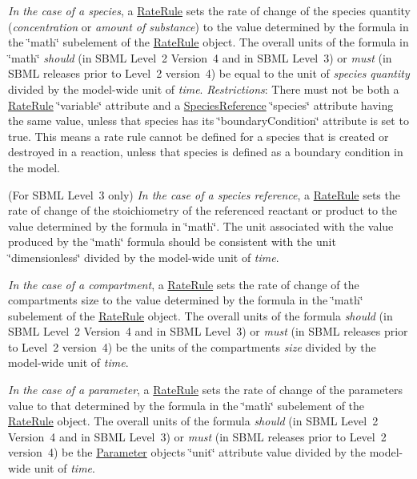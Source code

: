 \begin{DoxyItemize}
\item {\itshape In the case of a species}, a \hyperlink{class_rate_rule}{Rate\+Rule} sets the rate of change of the species\textquotesingle{} quantity ({\itshape concentration} or {\itshape amount of substance}) to the value determined by the formula in the \char`\"{}math\char`\"{} subelement of the \hyperlink{class_rate_rule}{Rate\+Rule} object. The overall units of the formula in \char`\"{}math\char`\"{} {\itshape should} (in S\+B\+ML Level~2 Version~4 and in S\+B\+ML Level~3) or {\itshape must} (in S\+B\+ML releases prior to Level~2 version~4) be equal to the unit of {\itshape species quantity} divided by the model-\/wide unit of {\itshape time}. {\itshape Restrictions}\+: There must not be both a \hyperlink{class_rate_rule}{Rate\+Rule} \char`\"{}variable\char`\"{} attribute and a \hyperlink{class_species_reference}{Species\+Reference} \char`\"{}species\char`\"{} attribute having the same value, unless that species has its \char`\"{}boundary\+Condition\char`\"{} attribute is set to {\ttfamily true}. This means a rate rule cannot be defined for a species that is created or destroyed in a reaction, unless that species is defined as a boundary condition in the model.


\item (For S\+B\+ML Level~3 only) {\itshape In the case of a species reference}, a \hyperlink{class_rate_rule}{Rate\+Rule} sets the rate of change of the stoichiometry of the referenced reactant or product to the value determined by the formula in \char`\"{}math\char`\"{}. The unit associated with the value produced by the \char`\"{}math\char`\"{} formula should be consistent with the unit \char`\"{}dimensionless\char`\"{} divided by the model-\/wide unit of {\itshape time}.


\item {\itshape In the case of a compartment}, a \hyperlink{class_rate_rule}{Rate\+Rule} sets the rate of change of the compartment\textquotesingle{}s size to the value determined by the formula in the \char`\"{}math\char`\"{} subelement of the \hyperlink{class_rate_rule}{Rate\+Rule} object. The overall units of the formula {\itshape should} (in S\+B\+ML Level~2 Version~4 and in S\+B\+ML Level~3) or {\itshape must} (in S\+B\+ML releases prior to Level~2 version~4) be the units of the compartment\textquotesingle{}s {\itshape size} divided by the model-\/wide unit of {\itshape time}.


\item {\itshape In the case of a parameter}, a \hyperlink{class_rate_rule}{Rate\+Rule} sets the rate of change of the parameter\textquotesingle{}s value to that determined by the formula in the \char`\"{}math\char`\"{} subelement of the \hyperlink{class_rate_rule}{Rate\+Rule} object. The overall units of the formula {\itshape should} (in S\+B\+ML Level~2 Version~4 and in S\+B\+ML Level~3) or {\itshape must} (in S\+B\+ML releases prior to Level~2 version~4) be the \hyperlink{class_parameter}{Parameter} object\textquotesingle{}s \char`\"{}unit\char`\"{} attribute value divided by the model-\/wide unit of {\itshape time}.



\end{DoxyItemize}
